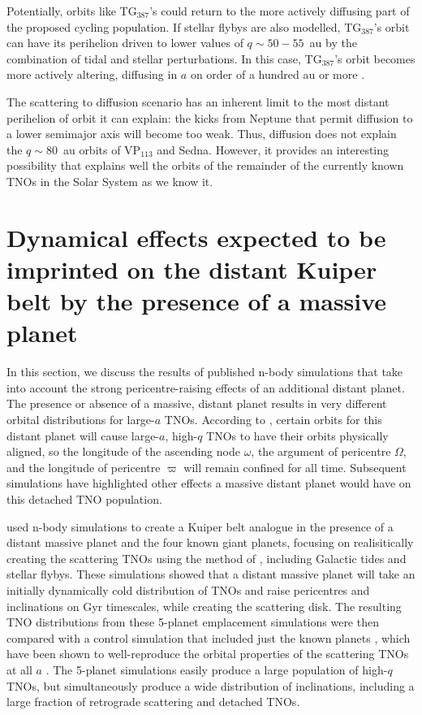 \documentclass[preprint]{aastex62}
\begin{document}
Potentially, orbits like TG$_{387}$'s could return to the more actively diffusing part of the proposed cycling population.
If stellar flybys are also modelled, TG$_{387}$'s orbit can have its perihelion driven to lower values of $q \sim 50-55$~au by the combination of tidal and stellar perturbations. In this case, TG$_{387}$'s orbit becomes more actively altering, diffusing in $a$ on order of a hundred au or more \citep{sheppard18}. 

The scattering to diffusion scenario has an inherent limit to the most distant perihelion of orbit it can explain: the kicks from Neptune that permit diffusion to a lower semimajor axis will become too weak. 
Thus, diffusion does not explain the $q \sim 80$~au orbits of VP$_{113}$ and Sedna. 
However, it provides an interesting possibility that explains well the orbits of the remainder of the currently known TNOs in the Solar System as we know it.

\section{Dynamical effects expected to be imprinted on the distant Kuiper belt by the presence of a massive planet}

In this section, we discuss the results of published n-body simulations that take into account the strong pericentre-raising effects of an additional distant planet.
The presence or absence of a massive, distant planet results in very different orbital distributions for large-$a$ TNOs.  
According to \citet{batyginbrown16}, certain orbits for this distant planet will cause large-$a$, high-$q$ TNOs to have their orbits physically aligned, so the longitude of the ascending node $\omega$, the argument of pericentre $\Omega$, and the longitude of pericentre $\varpi$ will remain confined for all time.
Subsequent simulations have highlighted other effects a massive distant planet would have on this detached TNO population.

\citet{lawler2017} used n-body simulations to create a Kuiper belt analogue in the presence of a distant massive planet and the four known giant planets, focusing on realisitically creating the scattering TNOs using the method of \citet{kaib11b}, including Galactic tides and stellar flybys.  
These simulations showed that a distant massive planet will take an initially dynamically cold distribution of TNOs and raise pericentres and inclinations on Gyr timescales, while creating the scattering disk.
The resulting TNO distributions from these 5-planet emplacement simulations were then compared with a control simulation that included just the known planets \citep{kaib11b}, which have been shown to well-reproduce the orbital properties of the scattering TNOs at all $a$ \citep{shankman13,lawler2018scat}. 
The 5-planet simulations easily produce a large population of high-$q$ TNOs, but simultaneously produce a wide distribution of inclinations, including a large fraction of retrograde scattering and detached TNOs.
\end{document}
